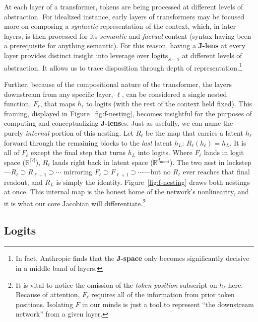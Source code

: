 \documentclass{article}
\newcommand{\logits}{\mathrm{logits}}
\newcommand{\dmodel}{d_{\text{model}}}
\begin{document}
At each layer of a transformer, tokens are being processed at different levels of abstraction. For idealized instance, early layers of transformers may be focused more on composing a \textit{syntactic} representation of the context, which, in later layers, is then processed for its \textit{semantic} and \textit{factual} content (syntax having been a prerequisite for anything semantic). For this reason, having a \textbf{J-lens} at every layer provides distinct insight into leverage over \(\logits_{S-1}\) at different levels of abstraction. It allows us to trace disposition through depth of representation.\footnote{In fact, Anthropic finds that the \textbf{J-space} only becomes significantly decisive in a middle band of layers.}

Further, because of the compositional nature of the transformer, the layers downstream from any specific layer, \(\ell\), can be considered a single nested function, \(F_\ell\), that maps \(h_{\ell}\) to \(\logits\) (with the rest of the context held fixed). This framing, displayed in Figure~\ref{fig:f-nesting}, becomes insightful for the purposes of computing and conceptualizing \textbf{J-lens}es. Just as usefully, we can name the purely \textit{internal} portion of this nesting. Let \(R_\ell\) be the map that carries a latent \(h_\ell\) forward through the remaining blocks to the \textit{last} latent \(h_L\): \(R_\ell(h_\ell) = h_L\). It is all of \(F_\ell\) except the final step that turns \(h_L\) into logits. Where \(F_\ell\) lands in logit space (\(\mathbb{R}^{|V|}\)), \(R_\ell\) lands right back in latent space (\(\mathbb{R}^{\dmodel}\)). The two nest in lockstep---\(R_\ell \supset R_{\ell+1} \supset \cdots\) mirroring \(F_\ell \supset F_{\ell+1} \supset \cdots\)---but no \(R_\ell\) ever reaches that final readout, and \(R_L\) is simply the identity. Figure~\ref{fig:f-nesting} draws both nestings at once. This internal map is the honest home of the network's nonlinearity, and it is what our core Jacobian will differentiate.\footnote{It is vital to notice the omission of the \textit{token position} subscript on \(h_\ell\) here. Because of attention, \(F_\ell\) requires all of the information from prior token positions. Isolating \(F\) in our minds is just a tool to represent ``the downstream network'' from a given layer.}

\subsection{Logits}
\end{document}
